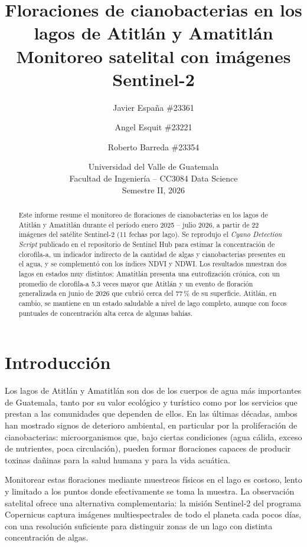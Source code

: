 \documentclass[11pt]{article}
\title{\vspace{-1.5cm}\textbf{Floraciones de cianobacterias en los lagos de Atitl\'an y Amatitl\'an}\\
\large Monitoreo satelital con im\'agenes Sentinel-2}
\author{
  Javier España \#23361 \and
  Angel Esquit \#23221 \and
  Roberto Barreda \#23354
}
\date{Universidad del Valle de Guatemala \\ Facultad de Ingenier\'ia -- CC3084 Data Science \\ Semestre II, 2026}
\begin{document}
\maketitle
\thispagestyle{empty}

\begin{abstract}
\noindent Este informe resume el monitoreo de floraciones de cianobacterias en los lagos de Atitl\'an y Amatitl\'an durante el per\'iodo enero 2025 -- julio 2026, a partir de 22 im\'agenes del sat\'elite Sentinel-2 (11 fechas por lago). Se reprodujo el \emph{Cyano Detection Script} publicado en el repositorio de Sentinel Hub para estimar la concentraci\'on de clorofila-a, un indicador indirecto de la cantidad de algas y cianobacterias presentes en el agua, y se complement\'o con los \'indices NDVI y NDWI. Los resultados muestran dos lagos en estados muy distintos: Amatitl\'an presenta una eutrofizaci\'on cr\'onica, con un promedio de clorofila-a 5.3 veces mayor que Atitl\'an y un evento de floraci\'on generalizada en junio de 2026 que cubri\'o cerca del 77\,\% de su superficie. Atitl\'an, en cambio, se mantiene en un estado saludable a nivel de lago completo, aunque con focos puntuales de concentraci\'on alta cerca de algunas bah\'ias.
\end{abstract}

\tableofcontents

\section{Introducci\'on}

Los lagos de Atitl\'an y Amatitl\'an son dos de los cuerpos de agua m\'as importantes de Guatemala, tanto por su valor ecol\'ogico y tur\'istico como por los servicios que prestan a las comunidades que dependen de ellos. En las \'ultimas d\'ecadas, ambos han mostrado signos de deterioro ambiental, en particular por la proliferaci\'on de cianobacterias: microorganismos que, bajo ciertas condiciones (agua c\'alida, exceso de nutrientes, poca circulaci\'on), pueden formar floraciones capaces de producir toxinas da\~ninas para la salud humana y para la vida acu\'atica.

Monitorear estas floraciones mediante muestreos f\'isicos en el lago es costoso, lento y limitado a los puntos donde efectivamente se toma la muestra. La observaci\'on satelital ofrece una alternativa complementaria: la misi\'on Sentinel-2 del programa Copernicus captura im\'agenes multiespectrales de todo el planeta cada pocos d\'ias, con una resoluci\'on suficiente para distinguir zonas de un lago con distinta concentraci\'on de algas.
\end{document}
